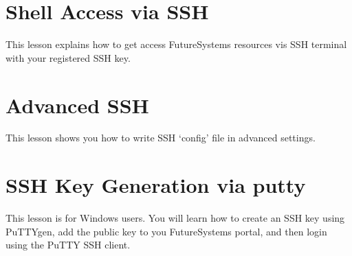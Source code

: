 \section{Shell Access via SSH}

This lesson explains how to get access FutureSystems resources vis SSH
terminal with your registered SSH key.


\section{Advanced SSH}

This lesson shows you how to write SSH `config' file in advanced
settings.


\section{SSH Key Generation via putty}

This lesson is for Windows users. You will learn how to create an SSH
key using PuTTYgen, add the public key to you FutureSystems portal,
and then login using the PuTTY SSH client.


\begin{comment}
\section{Creating VMs using Cloudmesh and running IPython}

This lesson explains how to log into FutureSystems and our customized
shell and menu options that will simplify management of the VMs for this
upcoming lessons.

Instruction is at:
\url{http://cloudmesh.github.io/introduction_to_cloud_computing/class/cm-mooc/cm-mooc.html}

\video{Python}{19:28}{Using FS - Creating VM using Cloudmesh and running IPython}{http://youtu.be/nbZbJxheLwc}
\end{comment}